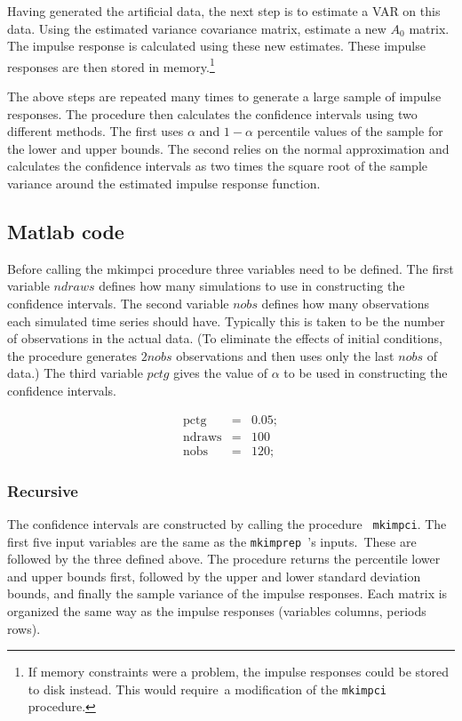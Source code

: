 \documentclass{article}
\begin{document}
Having generated the artificial data, the next step is to estimate a VAR on
this data. Using the estimated variance covariance matrix, estimate a new $%
A_{0}$ matrix. The impulse response is calculated using these new estimates$%
. $ These impulse responses are then stored in memory.\footnote{%
If memory constraints were a problem, the impulse responses could be stored
to disk instead. This would require\ a modification of the \texttt{mkimpci}
procedure.}

The above steps are repeated many times to generate a large sample of
impulse responses. The procedure then calculates the confidence intervals
using two different methods. The first uses $\alpha $ and $1-\alpha $
percentile values of the sample for the lower and upper bounds. The second
relies on the normal approximation and calculates the confidence intervals
as two times the square root of the sample variance around the estimated
impulse response function.

\subsection{Matlab code}

Before calling the mkimpci procedure three variables need to be defined. The
first variable $ndraws$ defines how many simulations to use in constructing
the confidence intervals. The second variable $nobs$ defines how many
observations each simulated time series should have. Typically this is taken
to be the number of observations in the actual data. (To eliminate the
effects of initial conditions, the procedure generates $2nobs$ observations
and then uses only the last $nobs$ of data.) The third variable $pctg$ gives
the value of $\alpha $ to be used in constructing the confidence intervals.

\begin{eqnarray*}
\text{pctg} &=&0.05; \\
\text{ndraws} &=&100 \\
\text{nobs} &=&120;
\end{eqnarray*}

\subsubsection{Recursive}

The confidence intervals are constructed by calling the procedure \texttt{%
mkimpci}. The first five input variables are the same as the \texttt{mkimprep%
}'s inputs.\ These are followed by the three defined above. The procedure
returns the percentile lower and upper bounds first, followed by the upper
and lower standard deviation bounds, and finally the sample variance of the
impulse responses. Each matrix is organized the same way as the impulse
responses (variables columns, periods rows).
\end{document}
